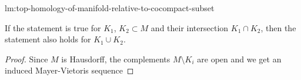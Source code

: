 
\begin{refproof}{lm:top-homology-of-manifold-relative-to-cocompact-subset}
  \begin{claim}
    If the statement is true for $K_1$, $K_2\subset M$ and their
    intersection $K_1\cap K_2$,
    then the statement also holds for $K_1\cup K_2$.
  \end{claim}
  \begin{proof}
    Since $M$ is Hausdorff, the complements  $M \setminus K_i$ are open
    and we get an induced Mayer-Vietoris sequence
  \end{proof}
\end{refproof}
